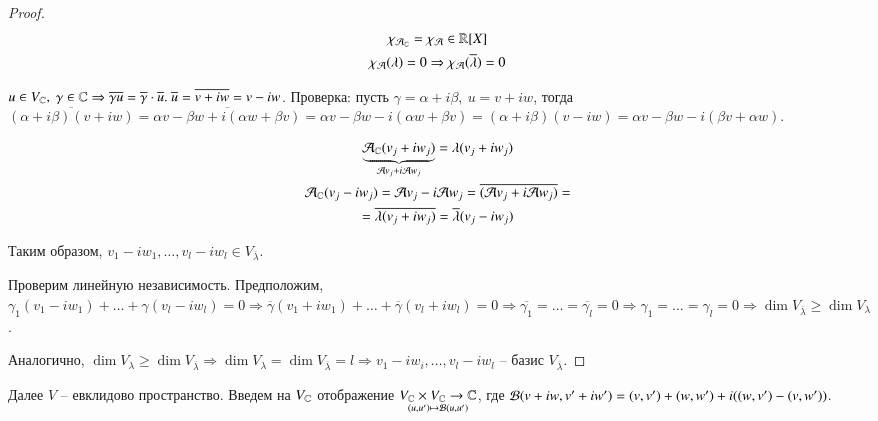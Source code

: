 \documentclass[main]{subfiles}
\begin{document}
\begin{proof}
    \begin{gather*}
        \chi_{\mathcal{A}_{\mathbb{C}}} = \chi_{\mathcal{A}} \in \mathbb{R}[X] \\
        \chi_{\mathcal{A}}(\lambda) = 0 \Rightarrow \chi_{\mathcal{A}}(\overline{\lambda}) = 0 \\
    \end{gather*}
    
    \begin{remark}
        $u \in V_{\C}, \ \gamma \in \C \Rightarrow \overline{\gamma u} = \overline{\gamma} \cdot \overline{u}. \ \overline{u} = \overline{v + iw} = v - iw$.
        Проверка: пусть $\gamma = \alpha + i\beta, \ u = v + iw$, тогда $\overline{(\alpha + i\beta)(v + iw)} =
         \overline{\alpha v - \beta w + i(\alpha w + \beta v)} = \alpha v - \beta w - i(\alpha w + \beta v) = (\alpha + i\beta)(v - iw) =
        \alpha v - \beta w -i(\beta v + \alpha w)$.
    \end{remark}

    \begin{gather*}
        \underbrace{\mathcal{A}_{\mathbb{C}}(v_j + iw_j)}_{\mathcal{A} v_j + i\mathcal{A} w_j} = \lambda(v_j + iw_j) \\
        \mathcal{A}_{\mathbb{C}}(v_j - iw_j) = \mathcal{A} v_j - i\mathcal{A} w_j = \overline{(\mathcal{A} v_j + i\mathcal{A} w_j)} = \\
        = \overline{\lambda(v_j + iw_j)} = \overline{\lambda}(v_j-iw_j)
    \end{gather*}

    Таким образом, $v_1 - iw_1, \ldots, v_l - iw_l \in V_{\overline{\lambda}}$.

    Проверим линейную независимость. Предположим, $\gamma_1(v_1 - iw_1) + \ldots +
    \gamma(v_l - iw_l) = 0 \Rightarrow \overline{\gamma}(v_1 + iw_1) + \ldots + \overline{\gamma}(v_l + iw_l) = 0 \Rightarrow
    \overline{\gamma_1} = \ldots = \overline{\gamma_l} = 0 \Rightarrow \gamma_1 = \ldots = \gamma_l = 0 \Rightarrow
    \dim V_{\overline{\lambda}} \geq \dim V_{\lambda}$.

    Аналогично, $\dim V_{\lambda} \geq \dim V_{\overline{\lambda}} \Rightarrow
    \dim V_{\lambda} = \dim V_{\overline{\lambda}} = l \Rightarrow 
    v_1 - iw_i, \ldots, v_l - iw_l$ -- базис $V_{\overline{\lambda}}$.
\end{proof}

    Далее $V$ -- евклидово пространство. Введем на $V_{\mathbb{C}}$ отображение $\underset{(u, u') \mapsto \mathcal{B}(u, u')}{V_{\mathbb{C}}\times V_{\mathbb{C}}\to\mathbb{C}}$, 
    где $\mathcal{B}(v+iw, v'+iw') = (v, v') + (w, w') + i((w, v') - (v, w'))$. 
\end{document}
